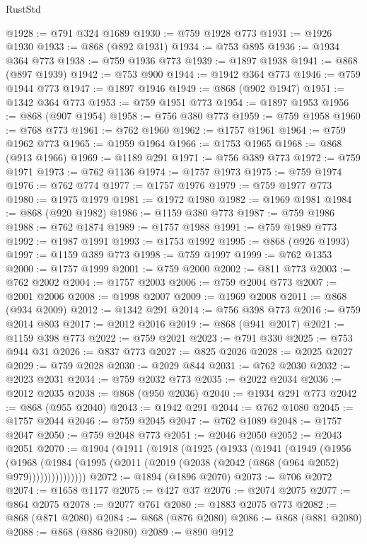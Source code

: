 \begin{lexlean}{RustStd}
\begin{coremodule}
@1928 := @791 @324 @1689
@1930 := @759 @1928 @773
@1931 := @1926 @1930
@1933 := @868 (@892 @1931)
@1934 := @753 @895
@1936 := @1934 @364 @773
@1938 := @759 @1936 @773
@1939 := @1897 @1938
@1941 := @868 (@897 @1939)
@1942 := @753 @900
@1944 := @1942 @364 @773
@1946 := @759 @1944 @773
@1947 := @1897 @1946
@1949 := @868 (@902 @1947)
@1951 := @1342 @364 @773
@1953 := @759 @1951 @773
@1954 := @1897 @1953
@1956 := @868 (@907 @1954)
@1958 := @756 @380 @773
@1959 := @759 @1958
@1960 := @768 @773
@1961 := @762 @1960
@1962 := @1757 @1961
@1964 := @759 @1962 @773
@1965 := @1959 @1964
@1966 := @1753 @1965
@1968 := @868 (@913 @1966)
@1969 := @1189 @291
@1971 := @756 @389 @773
@1972 := @759 @1971
@1973 := @762 @1136
@1974 := @1757 @1973
@1975 := @759 @1974
@1976 := @762 @774
@1977 := @1757 @1976
@1979 := @759 @1977 @773
@1980 := @1975 @1979
@1981 := @1972 @1980
@1982 := @1969 @1981
@1984 := @868 (@920 @1982)
@1986 := @1159 @380 @773
@1987 := @759 @1986
@1988 := @762 @1874
@1989 := @1757 @1988
@1991 := @759 @1989 @773
@1992 := @1987 @1991
@1993 := @1753 @1992
@1995 := @868 (@926 @1993)
@1997 := @1159 @389 @773
@1998 := @759 @1997
@1999 := @762 @1353
@2000 := @1757 @1999
@2001 := @759 @2000
@2002 := @811 @773
@2003 := @762 @2002
@2004 := @1757 @2003
@2006 := @759 @2004 @773
@2007 := @2001 @2006
@2008 := @1998 @2007
@2009 := @1969 @2008
@2011 := @868 (@934 @2009)
@2012 := @1342 @291
@2014 := @756 @398 @773
@2016 := @759 @2014 @803
@2017 := @2012 @2016
@2019 := @868 (@941 @2017)
@2021 := @1159 @398 @773
@2022 := @759 @2021
@2023 := @791 @330
@2025 := @753 @944 @31
@2026 := @837 @773
@2027 := @825 @2026
@2028 := @2025 @2027
@2029 := @759 @2028
@2030 := @2029 @844
@2031 := @762 @2030
@2032 := @2023 @2031
@2034 := @759 @2032 @773
@2035 := @2022 @2034
@2036 := @2012 @2035
@2038 := @868 (@950 @2036)
@2040 := @1934 @291 @773
@2042 := @868 (@955 @2040)
@2043 := @1942 @291
@2044 := @762 @1080
@2045 := @1757 @2044
@2046 := @759 @2045
@2047 := @762 @1089
@2048 := @1757 @2047
@2050 := @759 @2048 @773
@2051 := @2046 @2050
@2052 := @2043 @2051
@2070 := @1904
    (@1911
      (@1918
        (@1925
          (@1933
            (@1941
              (@1949
                (@1956
                  (@1968
                    (@1984 (@1995 (@2011 (@2019 (@2038 (@2042 (@868 (@964 @2052) @979)))))))))))))))
@2072 := @1894 (@1896 @2070)
@2073 := @706 @2072
@2074 := @1658 @1177
@2075 := @427 @37
@2076 := @2074 @2075
@2077 := @864 @2075
@2078 := @2077 @761
@2080 := @1883 @2075 @773
@2082 := @868 (@871 @2080)
@2084 := @868 (@876 @2080)
@2086 := @868 (@881 @2080)
@2088 := @868 (@886 @2080)
@2089 := @890 @912

\end{coremodule}
\end{lexlean}
